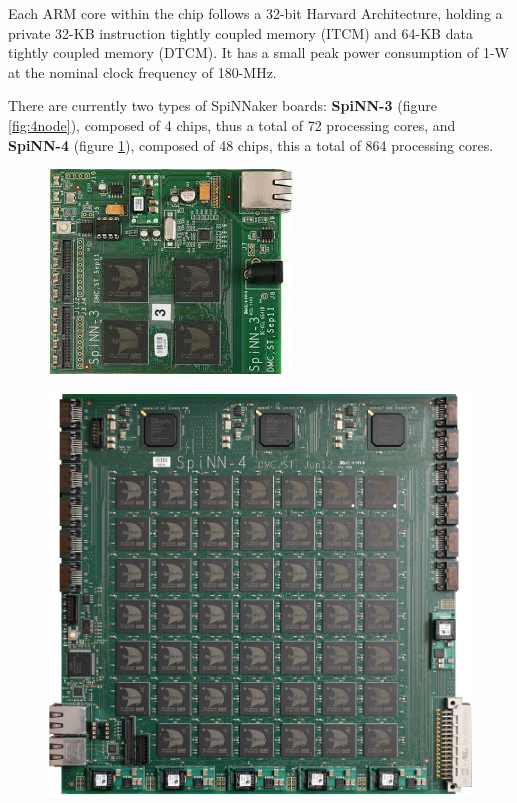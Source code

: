 Each ARM core within the chip follows a 32-bit Harvard Architecture, holding a private 32-KB instruction tightly coupled memory (ITCM) and 64-KB data tightly coupled memory (DTCM).\cite{painkras} It has a small peak power consumption of 1-W at the nominal clock frequency of 180-MHz.\cite{arm968}

There are currently two types of SpiNNaker boards: \textbf{SpiNN-3} (figure \ref{fig:4node}), composed of 4 chips, thus a total of 72 processing cores, and \textbf{SpiNN-4} (figure \ref{fig:48node}), composed of 48 chips, this a total of 864 processing cores.

\begin{figure}
\centering
\begin{minipage}{.5\textwidth}
  \centering
  \includegraphics[width=0.4\linewidth, natwidth=245, natheight=205]{images/4node.jpg}
  \label{fig:4node}
\end{minipage}%
\begin{minipage}{.5\textwidth}
  \centering
  \includegraphics[width=0.9\linewidth, natwidth=945, natheight=896]{images/48node.jpg}
  \label{fig:48node}
\end{minipage}
\end{figure}

